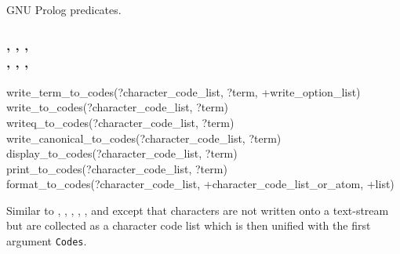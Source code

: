 \begin{PlErrors}


 


\end{PlErrors}

\Portability

GNU Prolog predicates.

\subsubsection{,
               ,
               , \\
               ,
               ,
               , \\
               }

\begin{TemplatesOneCol}
write\_term\_to\_codes(?character\_code\_list, ?term, +write\_option\_list)\\
write\_to\_codes(?character\_code\_list, ?term)\\
writeq\_to\_codes(?character\_code\_list, ?term)\\
write\_canonical\_to\_codes(?character\_code\_list, ?term)\\
display\_to\_codes(?character\_code\_list, ?term)\\
print\_to\_codes(?character\_code\_list, ?term)\\
format\_to\_codes(?character\_code\_list, +character\_code\_list\_or\_atom,
+list)

\end{TemplatesOneCol}

\Description

\texttt{}%
\texttt{}%
\texttt{}%
\texttt{}%
\texttt{}%
\texttt{}%
\texttt{}%
Similar to , , ,
, , 
 and   except that
characters are not written onto a text-stream but are collected as a
character code list which is then unified with the first argument
\texttt{Codes}.

